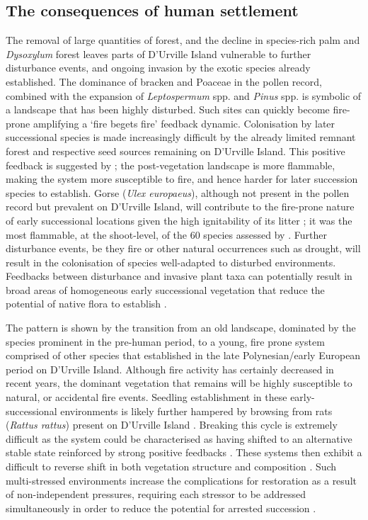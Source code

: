 \documentclass{article}
\begin{document}
\subsection{The consequences of human settlement}
The removal of large quantities of forest, and the decline in species-rich palm and \textit{Dysoxylum} forest leaves parts of D'Urville Island vulnerable to further disturbance events, and ongoing invasion by the exotic species already established.  The dominance of bracken and Poaceae in the pollen record, combined with the expansion of \textit{Leptospermum} spp. and \textit{Pinus} spp. is symbolic of a landscape that has been highly disturbed. Such sites can quickly become fire-prone amplifying a `fire begets fire' feedback dynamic.  Colonisation by later successional species is made increasingly difficult by the already limited remnant forest and respective seed sources remaining on D'Urville Island.  This  positive feedback is suggested by \cite{Perry2014}; the post-vegetation landscape is more flammable, making the system more susceptible to fire, and hence harder for later succession species to establish.  Gorse (\textit {Ulex europaeus}), although not present in the pollen record but prevalent on D'Urville Island, will contribute to the fire-prone nature of early successional locations given the high ignitability of its litter \citep{madrigal2012evaluation}; it was the most flammable, at the shoot-level, of the 60 species assessed by \cite{wyse2016quantitative}.   Further disturbance events, be they fire or other natural occurrences such as drought, will result in the colonisation of species well-adapted to disturbed environments.  Feedbacks between disturbance and invasive plant taxa can potentially result in broad areas of homogeneous early successional vegetation that reduce the potential of native flora to establish \citep{gaertner2014invasive}. 

The  pattern is shown by the transition from an old landscape, dominated by the species prominent in the pre-human period, to a young, fire prone system comprised of other species that established in the late Polynesian/early European period on D'Urville Island.  Although fire activity has certainly decreased in recent years, the dominant vegetation that remains will be highly susceptible to natural, or accidental fire events.  Seedling establishment in these early-successional environments is likely further hampered by browsing from rats (\textit{Rattus rattus}) present on D'Urville Island \citep{wilson2003effects}.  Breaking this cycle is extremely difficult as the system could be characterised as having shifted to an alternative stable state reinforced by strong positive feedbacks \citep{bowman2015feedbacks}.  These systems then exhibit a difficult to reverse shift in both vegetation structure and composition \citep{Perry2014}. Such multi-stressed environments increase the complications for restoration as a result of non-independent pressures, requiring each stressor to be addressed simultaneously in order to reduce the potential for arrested succession \citep{perry2015exotic}.  
\end{document}
